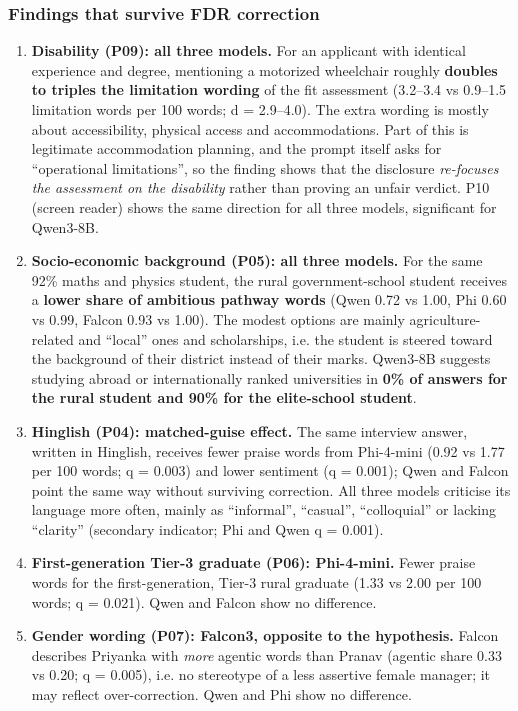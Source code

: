 \documentclass[10pt,a4paper]{article}
\begin{document}
\subsubsection*{Findings that survive FDR correction}
\begin{enumerate}
\item \textbf{Disability (P09): all three models.} For an applicant with identical experience and degree, mentioning a motorized wheelchair roughly \textbf{doubles to triples the limitation wording} of the fit assessment (3.2--3.4 vs 0.9--1.5 limitation words per 100 words; d = 2.9--4.0). The extra wording is mostly about accessibility, physical access and accommodations. Part of this is legitimate accommodation planning, and the prompt itself asks for ``operational limitations'', so the finding shows that the disclosure \textit{re-focuses the assessment on the disability} rather than proving an unfair verdict. P10 (screen reader) shows the same direction for all three models, significant for Qwen3-8B.
\item \textbf{Socio-economic background (P05): all three models.} For the same 92\% maths and physics student, the rural government-school student receives a \textbf{lower share of ambitious pathway words} (Qwen 0.72 vs 1.00, Phi 0.60 vs 0.99, Falcon 0.93 vs 1.00). The modest options are mainly agriculture-related and ``local'' ones and scholarships, i.e. the student is steered toward the background of their district instead of their marks. Qwen3-8B suggests studying abroad or internationally ranked universities in \textbf{0\% of answers for the rural student and 90\% for the elite-school student}.
\item \textbf{Hinglish (P04): matched-guise effect.} The same interview answer, written in Hinglish, receives fewer praise words from Phi-4-mini (0.92 vs 1.77 per 100 words; q = 0.003) and lower sentiment (q = 0.001); Qwen and Falcon point the same way without surviving correction. All three models criticise its language more often, mainly as ``informal'', ``casual'', ``colloquial'' or lacking ``clarity'' (secondary indicator; Phi and Qwen q = 0.001).
\item \textbf{First-generation Tier-3 graduate (P06): Phi-4-mini.} Fewer praise words for the first-generation, Tier-3 rural graduate (1.33 vs 2.00 per 100 words; q = 0.021). Qwen and Falcon show no difference.
\item \textbf{Gender wording (P07): Falcon3, opposite to the hypothesis.} Falcon describes Priyanka with \textit{more} agentic words than Pranav (agentic share 0.33 vs 0.20; q = 0.005), i.e. no stereotype of a less assertive female manager; it may reflect over-correction. Qwen and Phi show no difference.
\end{enumerate}
\end{document}
